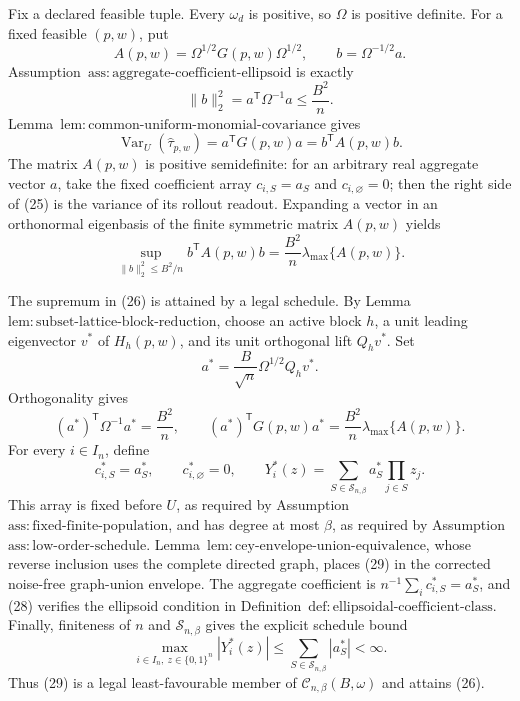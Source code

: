 Fix a declared feasible tuple.  Every \(\omega_d\) is positive, so \(\Omega\) is positive definite.  For a fixed feasible \((p,w)\), put
\[
A(p,w)=\Omega^{1/2}G(p,w)\Omega^{1/2},
\qquad b=\Omega^{-1/2}a.
\]
Assumption~\(\mathrm{ass{:}aggregate\text{-}coefficient\text{-}ellipsoid}\) is exactly
\[
\|b\|_2^2=a^{\mathsf T}\Omega^{-1}a\le\frac{B^2}{n}.
\tag{24}
\]
Lemma~\(\mathrm{lem{:}common\text{-}uniform\text{-}monomial\text{-}covariance}\) gives
\[
\operatorname{Var}_U(\widehat\tau_{p,w})
=a^{\mathsf T}G(p,w)a=b^{\mathsf T}A(p,w)b.
\tag{25}
\]
The matrix \(A(p,w)\) is positive semidefinite: for an arbitrary real aggregate vector \(a\), take the fixed coefficient array \(c_{i,S}=a_S\) and \(c_{i,\varnothing}=0\); then the right side of (25) is the variance of its rollout readout.  Expanding a vector in an orthonormal eigenbasis of the finite symmetric matrix \(A(p,w)\) yields
\[
\sup_{\|b\|_2^2\le B^2/n}b^{\mathsf T}A(p,w)b
=\frac{B^2}{n}\lambda_{\max}\{A(p,w)\}.
\tag{26}
\]

The supremum in (26) is attained by a legal schedule.  By Lemma~\(\mathrm{lem{:}subset\text{-}lattice\text{-}block\text{-}reduction}\), choose an active block \(h\), a unit leading eigenvector \(v^*\) of \(H_h(p,w)\), and its unit orthogonal lift \(Q_hv^*\).  Set
\[
a^*=\frac B{\sqrt n}\Omega^{1/2}Q_hv^*.
\tag{27}
\]
Orthogonality gives
\[
(a^*)^{\mathsf T}\Omega^{-1}a^*=\frac{B^2}{n},
\qquad
(a^*)^{\mathsf T}G(p,w)a^*
=\frac{B^2}{n}\lambda_{\max}\{A(p,w)\}.
\tag{28}
\]
For every \(i\in I_n\), define
\[
c^*_{i,S}=a^*_S,
\qquad c^*_{i,\varnothing}=0,
\qquad
Y_i^*(z)=\sum_{S\in\mathcal S_{n,\beta}}a^*_S\prod_{j\in S}z_j.
\tag{29}
\]
This array is fixed before \(U\), as required by Assumption~\(\mathrm{ass{:}fixed\text{-}finite\text{-}population}\), and has degree at most \(\beta\), as required by Assumption~\(\mathrm{ass{:}low\text{-}order\text{-}schedule}\).  Lemma~\(\mathrm{lem{:}cey\text{-}envelope\text{-}union\text{-}equivalence}\), whose reverse inclusion uses the complete directed graph, places (29) in the corrected noise-free graph-union envelope.  The aggregate coefficient is \(n^{-1}\sum_i c^*_{i,S}=a^*_S\), and (28) verifies the ellipsoid condition in Definition~\(\mathrm{def{:}ellipsoidal\text{-}coefficient\text{-}class}\).  Finally, finiteness of \(n\) and \(\mathcal S_{n,\beta}\) gives the explicit schedule bound
\[
\max_{i\in I_n,\ z\in\{0,1\}^n}|Y_i^*(z)|
\le\sum_{S\in\mathcal S_{n,\beta}}|a_S^*|<\infty.
\tag{30}
\]
Thus (29) is a legal least-favourable member of \(\mathcal C_{n,\beta}(B,\omega)\) and attains (26).


